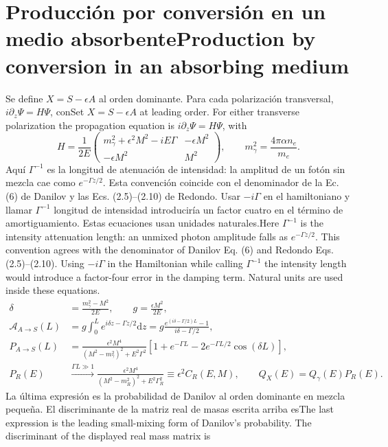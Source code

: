 \documentclass[11pt]{article}
\newcommand{\B}[2]{\ifspanish#2\else#1\fi}
\newcommand{\dd}{\mathrm d}\newcommand{\slsh}[1]{\not\!#1}
\begin{document}
\section{\B{Production by conversion in an absorbing medium}{Producción por conversión en un medio absorbente}}
\B{Set $X=S-\epsilon A$ at leading order. For either transverse polarization the propagation equation is $i\partial_z\Psi=H\Psi$, with}
{Se define $X=S-\epsilon A$ al orden dominante. Para cada polarización transversal, $i\partial_z\Psi=H\Psi$, con}
\begin{equation}
 H=\frac1{2E}\begin{pmatrix}m_\gamma^2+\epsilon^2M^2-iE\Gamma&-\epsilon M^2\\-\epsilon M^2&M^2\end{pmatrix},
 \qquad m_\gamma^2=\frac{4\pi\alpha n_e}{m_e}.
\end{equation}
\B{Here $\Gamma^{-1}$ is the intensity attenuation length: an unmixed photon amplitude falls as $e^{-\Gamma z/2}$. This convention agrees with the denominator of Danilov Eq. (6) and Redondo Eqs. (2.5)--(2.10)\cite{redondo}. Using $-i\Gamma$ in the Hamiltonian while calling $\Gamma^{-1}$ the intensity length would introduce a factor-four error in the damping term. Natural units are used inside these equations.}
{Aquí $\Gamma^{-1}$ es la longitud de atenuación de intensidad: la amplitud de un fotón sin mezcla cae como $e^{-\Gamma z/2}$. Esta convención coincide con el denominador de la Ec. (6) de Danilov y las Ecs. (2.5)--(2.10) de Redondo\cite{redondo}. Usar $-i\Gamma$ en el hamiltoniano y llamar $\Gamma^{-1}$ longitud de intensidad introduciría un factor cuatro en el término de amortiguamiento. Estas ecuaciones usan unidades naturales.}
\begin{align}
 \delta&=\frac{m_\gamma^2-M^2}{2E},\qquad g=\frac{\epsilon M^2}{2E},\\
 \mathcal A_{A\to S}(L)&=g\int_0^L e^{i\delta z-\Gamma z/2}\dd z
 =g\frac{e^{(i\delta-\Gamma/2)L}-1}{i\delta-\Gamma/2},\\
 P_{A\to S}(L)&=\frac{\epsilon^2M^4}{(M^2-m_\gamma^2)^2+E^2\Gamma^2}
 [1+e^{-\Gamma L}-2e^{-\Gamma L/2}\cos(\delta L)],\\
 P_R(E)&\xrightarrow{\Gamma L\gg1}\frac{\epsilon^2M^4}{(M^2-m_R^2)^2+E^2\Gamma_R^2}
 \equiv\epsilon^2 C_R(E,M),\qquad Q_X(E)=Q_\gamma(E)P_R(E).
\end{align}
\B{The last expression is the leading small-mixing form of Danilov's probability. The discriminant of the displayed real mass matrix is}
{La última expresión es la probabilidad de Danilov al orden dominante en mezcla pequeña. El discriminante de la matriz real de masas escrita arriba es}
\end{document}

